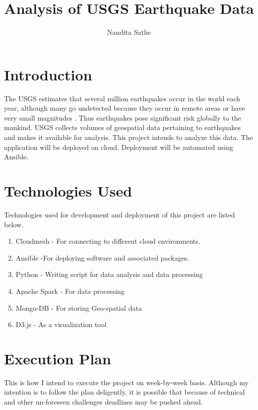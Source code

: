 \documentclass[9pt,twocolumn,twoside]{styles/osajnl}
\title{Analysis of USGS Earthquake Data}
\author[1,*]{Nandita Sathe}
\affil[1]{School of Informatics and Computing, Bloomington, IN 47408, U.S.A.}
\affil[*]{Corresponding authors: nsathe@iu.edu}
\begin{document}
\maketitle

\section{Introduction}

The USGS estimates that several million earthquakes occur in the world each year, although many go undetected because they occur in remote areas or have very small magnitudes \cite{www-usgs2}. Thus earthquakes pose significant risk globally to the mankind. USGS collects volumes of geospatial data pertaining to earthquakes and makes it available for analysis. This project intends to analyze this data. The application will be deployed on cloud. Deployment will be automated using Ansible. 

\section{Technologies Used}

Technologies used for development and deployment of this project are listed below.
\begin{enumerate}

\item Cloudmesh - For connecting to different cloud environments.
\item Ansible -For deploying software and associated packages.
\item Python - Writing script for data analysis and data processing 
\item Apache Spark - For data processing
\item Mongo-DB - For storing Geo-spatial data
\item D3.js - As a visualization tool
\end{enumerate}

\section{Execution Plan}

This is how I intend to execute the project on week-by-week basis. Although my intention is to follow the plan deligently, it is possible that because of technical and other un-foreseen challenges deadlines may be pushed ahead.
\end{document}
